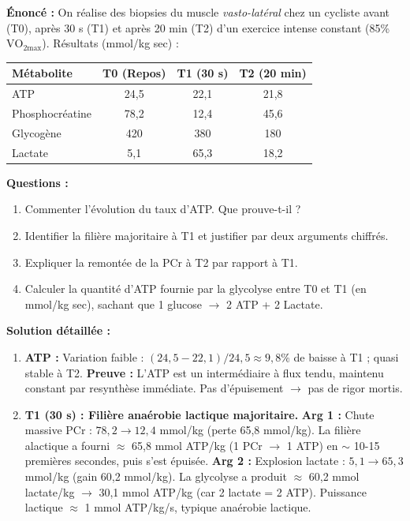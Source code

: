 \documentclass[11pt]{article}
\begin{document}
\begin{exoresolu}
\textbf{Énoncé :} On réalise des biopsies du muscle \emph{vasto-latéral} chez un cycliste avant (T0), après 30 s (T1) et après 20 min (T2) d'un exercice intense constant (85\% $\text{VO}_{2\text{max}}$). Résultats (mmol/kg sec) :
\begin{center}
\begin{tabular}{|l|ccc|}\hline
Métabolite & T0 (Repos) & T1 (30 s) & T2 (20 min) \\ \hline
ATP & 24,5 & 22,1 & 21,8 \\
Phosphocréatine & 78,2 & 12,4 & 45,6 \\
Glycogène & 420 & 380 & 180 \\
Lactate & 5,1 & 65,3 & 18,2 \\ \hline
\end{tabular}
\end{center}
\textbf{Questions :}
\begin{enumerate}
    \item Commenter l'évolution du taux d'ATP. Que prouve-t-il ?
    \item Identifier la filière majoritaire à T1 et justifier par deux arguments chiffrés.
    \item Expliquer la remontée de la PCr à T2 par rapport à T1.
    \item Calculer la quantité d'ATP fournie par la glycolyse entre T0 et T1 (en mmol/kg sec), sachant que 1 glucose $\rightarrow$ 2 ATP + 2 Lactate.
\end{enumerate}
\textbf{Solution détaillée :}
\begin{enumerate}
    \item \textbf{ATP :} Variation faible : $(24,5-22,1)/24,5 \approx 9,8\%$ de baisse à T1 ; quasi stable à T2. \textbf{Preuve :} L'ATP est un intermédiaire à flux tendu, maintenu constant par resynthèse immédiate. Pas d'épuisement $\rightarrow$ pas de rigor mortis.
    \item \textbf{T1 (30 s) : Filière anaérobie lactique majoritaire.}
        \textbf{Arg 1 :} Chute massive PCr : $78,2 \rightarrow 12,4$ mmol/kg (perte 65,8 mmol/kg). La filière alactique a fourni $\approx$ 65,8 mmol ATP/kg (1 PCr $\rightarrow$ 1 ATP) en $\sim$ 10-15 premières secondes, puis s'est épuisée.
        \textbf{Arg 2 :} Explosion lactate : $5,1 \rightarrow 65,3$ mmol/kg (gain 60,2 mmol/kg). La glycolyse a produit $\approx$ 60,2 mmol lactate/kg $\rightarrow$ 30,1 mmol ATP/kg (car 2 lactate = 2 ATP). Puissance lactique $\approx$ 1 mmol ATP/kg/s, typique anaérobie lactique.

\end{enumerate}
\end{exoresolu}
\end{document}

